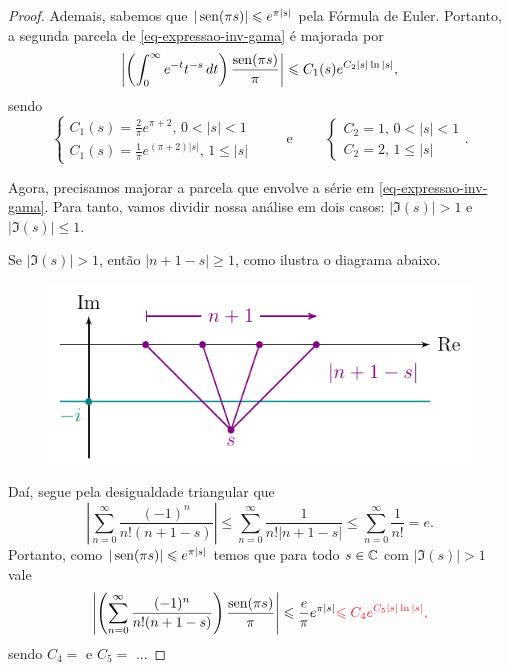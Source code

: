 \begin{proof}
        Ademais, sabemos que $|\operatorname{sen}(\pi s)| \leqslant e^{\pi |s|}$ pela Fórmula de Euler. Portanto,
        a segunda parcela de \eqref{eq-expressao-inv-gama} é majorada por
        \begin{equation}
            \left| \left( \int_0^{\infty} e^{-t}t^{-s} \, dt \right)\frac{\operatorname{sen}(\pi s)}{\pi} \right|
            \leqslant
            C_1(s)e^{C_2|s|\ln|s|},
        \end{equation}
        sendo
        \[
        \begin{cases}
            C_1(s) = \frac{2}{\pi}e^{\pi + 2}, \, 0 < |s| < 1 \\
            C_1(s) = \frac{1}{\pi}e^{(\pi + 2)|s|}, \, 1\leq |s|
        \end{cases} \qquad \text{ e } \qquad
        \begin{cases}
            C_2 = 1, \, 0 < |s| < 1 \\
            C_2 = 2, \, 1\leq |s|
        \end{cases}.
        \]
        
        Agora, precisamos majorar a parcela que envolve a série em \eqref{eq-expressao-inv-gama}.
        Para tanto, vamos dividir nossa análise em dois casos: $|\Im(s)| > 1$ e $|\Im(s)|\leq 1$.
        
        Se $|\Im(s)| > 1$, então $|n+1-s| \geq 1$, como ilustra o diagrama abaixo.
        \begin{figure}[H]\centering
            \includegraphics{Figuras/Im(s)>1.pdf}
        \end{figure}
        Daí, segue pela desigualdade triangular que
        \[
        \left| \sum_{n=0}^{\infty} \frac{(-1)^n}{n!(n+1-s)} \right| 
        \leq \sum_{n=0}^{\infty} \frac{1}{n!|n+1-s|} 
        \leq \sum_{n=0}^{\infty} \frac{1}{n!}
        = e.
        \]
        Portanto, como $|\operatorname{sen}(\pi s)| \leqslant e^{\pi |s|}$ temos que para todo $s\in\mathbb{C}$ com $|\Im(s)|>1$
        vale
        \[
        \left| \left(\sum_{n=0}^{\infty} \frac{(-1)^n}{n!(n+1-s)}\right)\frac{\sen(\pi s)}{\pi} \right|
        \leq \frac{e}{\pi} e^{\pi |s|}
        \red{\leq C_4e^{C_5|s|\ln|s|}},
        \]
        sendo $C_4 = $ e $C_5 = $ ...
        

\end{proof}
